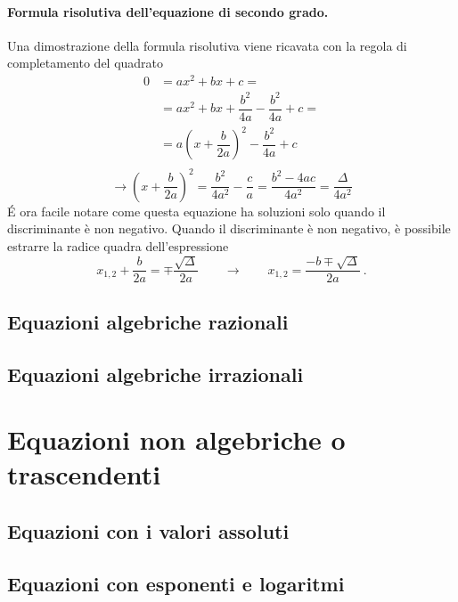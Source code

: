 \paragraph{Formula risolutiva dell'equazione di secondo grado.}
Una dimostrazione della formula risolutiva viene ricavata con la regola di completamento del quadrato
\begin{equation}
    \begin{aligned}
        0 & = a x^2 + b x + c = \\
          & = a x^2 + b x + \dfrac{b^2}{4a} - \dfrac{b^2}{4a} + c = \\
          & = a \left(x + \dfrac{b}{2a} \right)^2 - \dfrac{b^2}{4a} + c \\
    \end{aligned}
\end{equation}
\begin{equation}
    \rightarrow \left( x + \dfrac{b}{2a} \right)^2 = \dfrac{b^2}{4 a^2} - \dfrac{c}{a} = \dfrac{b^2 - 4 a c}{4a^2} = \dfrac{\Delta}{4a^2}
\end{equation}
\'E ora facile notare come questa equazione ha soluzioni solo quando il discriminante è non negativo. Quando il discriminante è non negativo, è possibile estrarre la radice quadra dell'espressione
\begin{equation}
    x_{1,2} + \dfrac{b}{2a} = \mp \dfrac{\sqrt{\Delta}}{2a} \qquad \rightarrow \qquad 
    x_{1,2} = \dfrac{-b  \mp \sqrt{\Delta}}{2a} \ . 
\end{equation}

\subsection{Equazioni algebriche razionali}
\subsection{Equazioni algebriche irrazionali}

\section{Equazioni non algebriche o trascendenti}
\subsection{Equazioni con i valori assoluti}
\subsection{Equazioni con esponenti e logaritmi}
